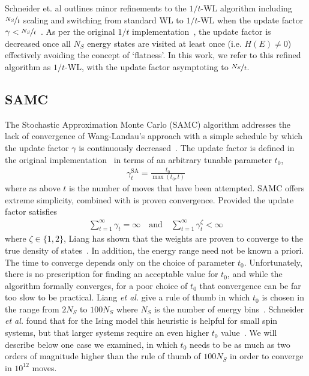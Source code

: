 \documentclass[letterpaper,twocolumn,amsmath,amssymb,pre,aps,10pt]{revtex4-1}
\begin{document}
Schneider et. al outlines minor refinements to the $1/t$-WL algorithm
including $\nicefrac{N_S}{t}$ scaling and switching from standard WL
to $1/t$-WL when the update factor $\gamma <
\nicefrac{N_S}{t}$~\cite{schneider2017convergence}. As per the
original $1/t$ implementation~\cite{belardinelli2007fast}, the update
factor is decreased once all $N_S$ energy states are visited at least
once (i.e. $H(E) \neq 0$) effectively avoiding the concept of
`flatness'.  In this work, we refer to this refined algorithm as $1/t$-WL,
with the update factor asymptoting to $\nicefrac{N_S}{t}$.


\subsection{SAMC}
The Stochastic Approximation Monte Carlo (SAMC) algorithm addresses
the lack of convergence of Wang-Landau's approach with a simple
schedule by which the update factor $\gamma$ is continuously
decreased~\cite{liang2007stochastic, werlich2015stochastic,
  schneider2017convergence}.  The update factor is defined in the
original implementation~\cite{liang2007stochastic} in terms of an
arbitrary tunable parameter $t_0$,
\begin{align}
\gamma_{t}^{\text{SA}} =\frac{t_0}{\max(t_0,t)}
\end{align}
where as above $t$ is the number of moves that have been attempted.
SAMC offers extreme simplicity, combined with is proven convergence.
Provided the update factor satisfies
\begin{align}
\sum_{t=1}^\infty \gamma_{t} = \infty \quad\textrm{and}\quad
\sum_{t=1}^\infty \gamma_{t}^\zeta < \infty
\end{align}
where $\zeta \in \{1,2\}$, Liang has shown that the weights are proven
to converge to the true density of states~\cite{liang2006theory,
  liang2007stochastic}.  In addition, the energy range need not be
known a priori.  The time to converge depends only on the choice of
parameter $t_0$.  Unfortunately, there is no prescription for finding
an acceptable value for $t_0$, and while the algorithm formally
converges, for a poor choice of $t_0$ that convergence can be far too
slow to be practical. Liang \emph{et al.} give a rule of thumb in
which $t_0$ is chosen in the range from $2N_S$ to $100N_S$ where $N_S$
is the number of energy bins~\cite{liang2007stochastic}.  Schneider
\emph{et al.} found that for the Ising model this heuristic is helpful
for small spin systems, but that larger systems require an even higher
$t_0$ value~\cite{schneider2017convergence}.  We will describe below
one case we examined, in which $t_0$ needs to be as much as two orders
of magnitude higher than the rule of thumb of $100N_S$ in order to
converge in $10^{12}$ moves.
\end{document}

